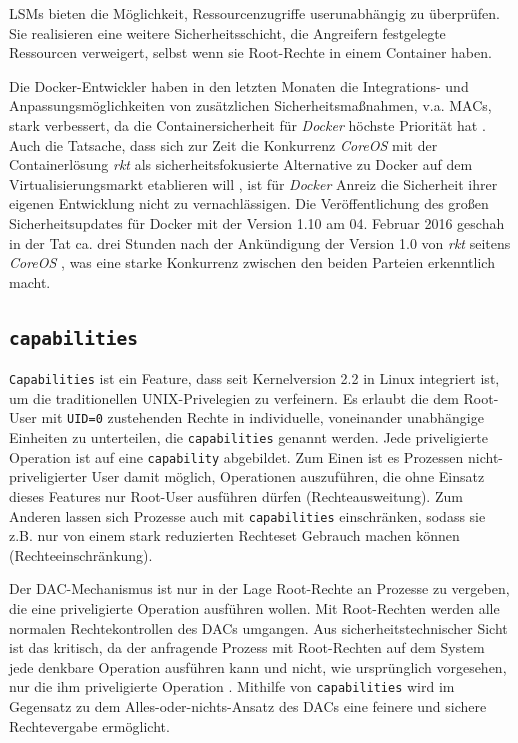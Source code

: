 \documentclass[../main.tex]{subfiles}
\begin{document}
		LSMs bieten die Möglichkeit, Ressourcenzugriffe userunabhängig zu überprüfen. Sie realisieren eine weitere Sicherheitsschicht, die Angreifern festgelegte Ressourcen verweigert, selbst wenn sie Root-Rechte in einem Container haben.

		Die Docker-Entwickler haben in den letzten Monaten die Integrations- und Anpassungsmöglichkeiten von zusätzlichen Sicherheitsmaßnahmen, v.a. MACs, stark verbessert, da die Containersicherheit für \emph{Docker} höchste Priorität hat \cite{githubDockerRoadmap}\cite{githubDockerChangelog}. Auch die Tatsache, dass sich zur Zeit die Konkurrenz \emph{CoreOS} mit der Containerlösung \emph{rkt} als sicherheitsfokusierte Alternative zu Docker auf dem Virtualisierungsmarkt etablieren will \cite{coreosAnnouncementRkt10}, ist für \emph{Docker} Anreiz die Sicherheit ihrer eigenen Entwicklung nicht zu vernachlässigen.
		Die Veröffentlichung des großen Sicherheitsupdates für Docker mit der Version 1.10 am 04. Februar 2016 geschah in der Tat ca. drei Stunden nach der Ankündigung der Version 1.0 von \emph{rkt} seitens \emph{CoreOS} \cite{hnAnnouncementDocker110}\cite{hnAnnouncementRkt10}, was eine starke Konkurrenz zwischen den beiden Parteien erkenntlich macht.
    \subsection{\texttt{capabilities}}
			\texttt{Capabilities} ist ein Feature, dass seit Kernelversion 2.2 in Linux integriert ist, um die traditionellen UNIX-Privelegien zu verfeinern. Es erlaubt die dem Root-User mit \texttt{UID=0} zustehenden Rechte in individuelle, voneinander unabhängige Einheiten zu unterteilen, die \texttt{capabilities} genannt werden. Jede priveligierte Operation ist auf eine \texttt{capability} abgebildet.
			Zum Einen ist es Prozessen nicht-priveligierter User damit möglich, Operationen auszuführen, die ohne Einsatz dieses Features nur Root-User ausführen dürfen (Rechteausweitung). Zum Anderen lassen sich Prozesse auch mit \texttt{capabilities} einschränken, sodass sie z.B. nur von einem stark reduzierten Rechteset Gebrauch machen können (Rechteeinschränkung)\cite[S.33]{linuxInterface}.

			Der DAC-Mechanismus ist nur in der Lage Root-Rechte an Prozesse zu vergeben, die eine priveligierte Operation ausführen wollen. Mit Root-Rechten werden alle normalen Rechtekontrollen des DACs umgangen.	Aus sicherheitstechnischer Sicht ist das kritisch, da der anfragende Prozess mit Root-Rechten auf dem System jede denkbare Operation ausführen kann und nicht, wie ursprünglich vorgesehen, nur die ihm priveligierte Operation \cite[S.797]{linuxInterface}. Mithilfe von \texttt{capabilities} wird im Gegensatz zu dem \glqq{}Alles-oder-nichts\grqq{}-Ansatz des DACs eine feinere und sichere Rechtevergabe ermöglicht.
\end{document}
